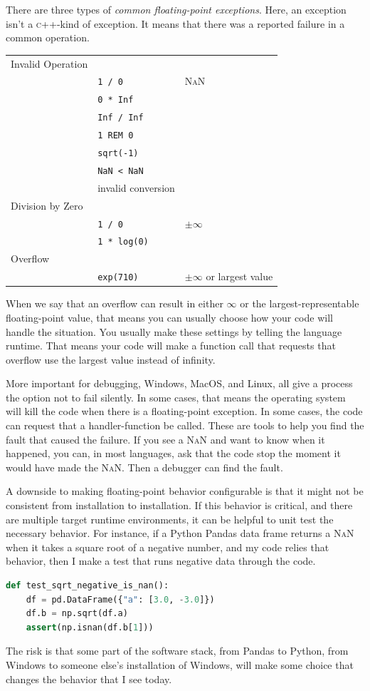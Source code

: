 \documentclass[fleqn,10pt]{olplainarticle}
\newcommand{\cpp}{\textsc{c}++\xspace}
\newcommand{\nan}{\textsc{NaN}\xspace}
\begin{document}
There are three types of \emph{common floating-point exceptions}.
Here, an exception isn't a \cpp{}-kind of exception. It means that
there was a reported failure in a common operation.

\begin{tabular}{lll}
Invalid Operation & & \\
 & \lstinline|1 / 0| & \nan \\
 & \lstinline|0 * Inf| & \\
 & \lstinline|Inf / Inf| & \\
 & \lstinline|1 REM 0| & \\
 & \lstinline|sqrt(-1)| & \\
 & \lstinline|NaN < NaN| & \\
 & invalid conversion & \\
Division by Zero & & \\
 & \lstinline|1 / 0| & $\pm\infty$ \\
 & \lstinline|1 * log(0)| & \\
Overflow & & \\
 & \lstinline|exp(710)| & $\pm\infty$ or largest value\\
\end{tabular}

When we say that an overflow can result in either $\infty$ or
the largest-representable floating-point value, that means you can
usually choose how your code will handle the situation. You usually
make these settings by telling the language runtime. That means your
code will make a function call that requests that overflow use the
largest value instead of infinity.

More important for debugging, Windows, MacOS, and Linux, all give
a process the option not to fail silently. In some cases, that means
the operating system will kill the code when there is a floating-point
exception. In some cases, the code can request that a handler-function
be called. These are tools to help you find the fault that caused the
failure. If you see a \nan and want to know when it happened, you can,
in most languages, ask that the code stop the moment it would have made
the \nan. Then a debugger can find the fault.

A downside to making floating-point behavior configurable is that
it might not be consistent from installation to installation.
If this behavior is critical, and there are multiple target runtime
environments, it can be helpful to unit test the necessary behavior.
For instance, if a Python Pandas data frame returns a \nan when it
takes a square root of a negative number, and my code relies that behavior,
then I make a test that runs negative data through the code.
\begin{lstlisting}[language=Python]
def test_sqrt_negative_is_nan():
    df = pd.DataFrame({"a": [3.0, -3.0]})
    df.b = np.sqrt(df.a)
    assert(np.isnan(df.b[1]))
\end{lstlisting}
The risk is that some part of the software stack, from Pandas to Python, from
Windows to someone else's installation of Windows,
will make some choice that changes the behavior that I see today.
\end{document}
